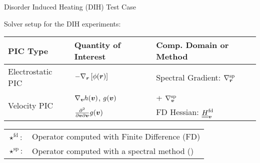 \begin{frame}{Disorder Induced Heating (DIH) Test Case}

    \begin{center}
        \item Solver setup for the DIH experiments:
            \begin{table}
                \renewcommand*\arraystretch{1.5}
                \centering
                \label{table:DIHsolverCombination}
                \begin{tabular}{|l|l|l|}
                    \hline
                    \textbf{PIC Type}                           & \textbf{Quantity of Interest}
                                                                & \textbf{Comp. Domain or Method}     \\ \hline
                    {Electrostatic PIC} &  $- \nabla_{\boldsymbol{r}} \left[ \phi(\boldsymbol{r}) \right]$ & Spectral Gradient: $\nabla_{\boldsymbol{r}}^{\text{sp}}$          \\ \hline
                    \multirow{2}{*}{Velocity PIC}      & $\nabla_{\boldsymbol{v}} h(\boldsymbol{v})$, $g(\boldsymbol{v})$                                        
                                                       & \cite{vicoGreengard2016} + $\nabla_{\boldsymbol{v}}^{\text{sp}}$                       \\ \cline{2-3} 
                                                       & $\frac{\partial^2}{\partial \boldsymbol{v} \partial \boldsymbol{v}} g(\boldsymbol{v})$
                                                       & FD Hessian: $\underline{\underline{H}}_{\boldsymbol{v}}^{\text{fd}}$           \\
                                                       \hline
                \end{tabular}
            \end{table}
        \vfill
            \begin{definitionBlock}
                \begin{tabular}{ll}
                    $\star^{\text{fd}}:$ & Operator computed with Finite Difference (FD) \\
                    $\star^{\text{sp}}:$ & Operator computed with a spectral method (\cite{vicoGreengard2016})
                \end{tabular}
            \end{definitionBlock}
        \end{center}
\end{frame}


